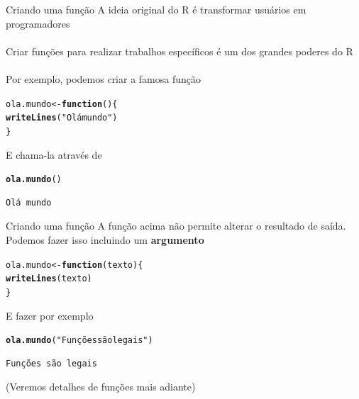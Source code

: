 \documentclass[10pt,handout]{beamer}\usepackage[]{graphicx}\usepackage[]{color}
\makeatletter
\newcommand{\hlstr}[1]{\textcolor[rgb]{0.282,0.239,0.545}{#1}}%
\newcommand{\hlstd}[1]{\textcolor[rgb]{0.345,0.345,0.345}{#1}}%
\newcommand{\hlkwa}[1]{\textcolor[rgb]{0.161,0.373,0.58}{\textbf{#1}}}%
\newcommand{\hlkwb}[1]{\textcolor[rgb]{0.69,0.353,0.396}{#1}}%
\newcommand{\hlkwc}[1]{\textcolor[rgb]{0.333,0.667,0.333}{#1}}%
\newcommand{\hlkwd}[1]{\textcolor[rgb]{0.282,0.239,0.545}{\textbf{#1}}}%
\newenvironment{kframe}{%
 \def\at@end@of@kframe{}%
 \ifinner\ifhmode%
  \def\at@end@of@kframe{\end{minipage}}%
  \begin{minipage}{\columnwidth}%
 \fi\fi%
 \def\FrameCommand##1{\hskip\@totalleftmargin \hskip-\fboxsep
 \colorbox{shadecolor}{##1}\hskip-\fboxsep
     \hskip-\linewidth \hskip-\@totalleftmargin \hskip\columnwidth}%
 \MakeFramed {\advance\hsize-\width
   \@totalleftmargin\z@ \linewidth\hsize
   \@setminipage}}%
 {\par\unskip\endMakeFramed%
 \at@end@of@kframe}
\newenvironment{knitrout}{}{} %
\makeatother
\begin{document}
\begin{frame}[fragile]{Criando uma função}
  A ideia original do R é transformar usuários em programadores \\~\\
  Criar funções para realizar trabalhos específicos é um dos grandes
  poderes do R \\~\\
  Por exemplo, podemos criar a famosa função
\begin{knitrout}\small
{}\color{fgcolor}\begin{kframe}
\begin{alltt}
\hlstd{ola.mundo} \hlkwb{<-} \hlkwa{function}\hlstd{()\{}
    \hlkwd{writeLines}\hlstd{(}\hlstr{"Olá mundo"}\hlstd{)}
\hlstd{\}}
\end{alltt}
\end{kframe}
\end{knitrout}

E chama-la através de
\begin{knitrout}\small
{}\color{fgcolor}\begin{kframe}
\begin{alltt}
\hlkwd{ola.mundo}\hlstd{()}
\end{alltt}
\begin{verbatim}
Olá mundo
\end{verbatim}
\end{kframe}
\end{knitrout}

\end{frame}

\begin{frame}[fragile]{Criando uma função}
A função acima não permite alterar o resultado de saída. Podemos fazer
isso incluindo um \textbf{argumento}
\begin{knitrout}\small
{}\color{fgcolor}\begin{kframe}
\begin{alltt}
\hlstd{ola.mundo} \hlkwb{<-} \hlkwa{function}\hlstd{(}\hlkwc{texto}\hlstd{)\{}
    \hlkwd{writeLines}\hlstd{(texto)}
\hlstd{\}}
\end{alltt}
\end{kframe}
\end{knitrout}

E fazer por exemplo
\begin{knitrout}\small
{}\color{fgcolor}\begin{kframe}
\begin{alltt}
\hlkwd{ola.mundo}\hlstd{(}\hlstr{"Funções são legais"}\hlstd{)}
\end{alltt}
\begin{verbatim}
Funções são legais
\end{verbatim}
\end{kframe}
\end{knitrout}

(Veremos detalhes de funções mais adiante)
\end{frame}
\end{document}
